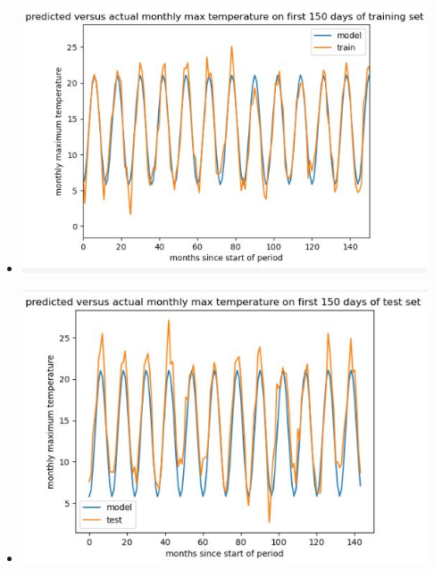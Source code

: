 \documentclass[12pt,twoside]{article}
\begin{document}
\begin{enumerate}
\begin{enumerate}
    \begin{itemize}
        \item \includegraphics[width=12cm]{homework_code/homework_11/immages/4c1.JPG}
        \item \includegraphics[width=12cm]{homework_code/homework_11/immages/4c2.JPG}


\end{itemize}
\end{enumerate}
\end{enumerate}
\end{document}
